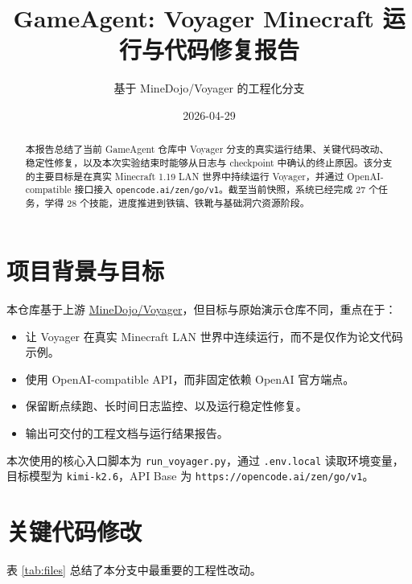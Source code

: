 \documentclass[11pt,a4paper]{ctexart}
\title{GameAgent: Voyager Minecraft 运行与代码修复报告}
\author{基于 MineDojo/Voyager 的工程化分支}
\date{2026-04-29}
\begin{document}
\maketitle

\begin{abstract}
本报告总结了当前 GameAgent 仓库中 Voyager 分支的真实运行结果、关键代码改动、稳定性修复，以及本次实验结束时能够从日志与 checkpoint 中确认的终止原因。该分支的主要目标是在真实 Minecraft 1.19 LAN 世界中持续运行 Voyager，并通过 OpenAI-compatible 接口接入 \texttt{opencode.ai/zen/go/v1}。截至当前快照，系统已经完成 27 个任务，学得 28 个技能，进度推进到铁镐、铁靴与基础洞穴资源阶段。
\end{abstract}

\section{项目背景与目标}

本仓库基于上游 \href{https://github.com/MineDojo/Voyager}{MineDojo/Voyager}，但目标与原始演示仓库不同，重点在于：

\begin{itemize}
  \item 让 Voyager 在真实 Minecraft LAN 世界中连续运行，而不是仅作为论文代码示例。
  \item 使用 OpenAI-compatible API，而非固定依赖 OpenAI 官方端点。
  \item 保留断点续跑、长时间日志监控、以及运行稳定性修复。
  \item 输出可交付的工程文档与运行结果报告。
\end{itemize}

本次使用的核心入口脚本为 \texttt{run\_voyager.py}，通过 \texttt{.env.local} 读取环境变量，目标模型为 \texttt{kimi-k2.6}，API Base 为 \texttt{https://opencode.ai/zen/go/v1}。

\section{关键代码修改}

表 \ref{tab:files} 总结了本分支中最重要的工程性改动。
\end{document}
